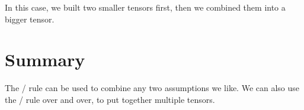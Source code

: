 \documentclass[../../../main.tex]{subfiles}
\begin{document}
\noindent
In this case, we built two smaller tensors first, then we combined them into a bigger tensor.


\section{Summary}

The \tensorIntro/ rule can be used to combine any two assumptions we like. We can also use the \tensorIntro/ rule over and over, to put together multiple tensors.
\end{document}
